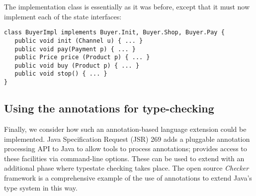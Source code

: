 The implementation class  is essentially as it was
before, except that it must now implement each of the state
interfaces:

\begin{lstlisting}
class BuyerImpl implements Buyer.Init, Buyer.Shop, Buyer.Pay {
   public void init (Channel u) { ... }
   public void pay(Payment p) { ... }
   public Price price (Product p) { ... }
   public void buy (Product p) { ... }
   public void stop() { ... }
}
\end{lstlisting}

\subsection{Using the annotations for type-checking}

Finally, we consider how such an annotation-based language extension
could be implemented. Java Specification Request (JSR) 269
\cite{jsr269} adds a pluggable annotation processing API to Java to
allow tools to process annotations;  provides access to
these facilities via command-line options. These can be used to extend
 with an additional phase where typestate checking takes
place. The open source \emph{Checker} framework \cite{papi08,dietl11}
is a comprehensive example of the use of annotations to extend Java's
type system in this way.

